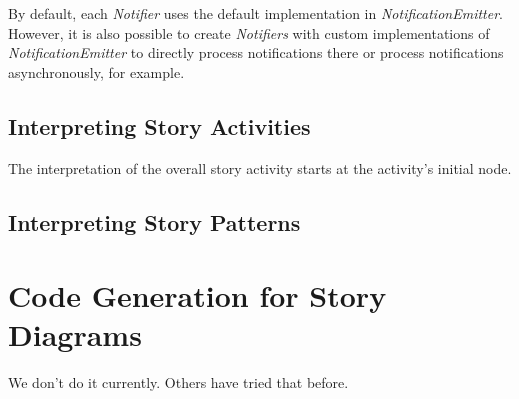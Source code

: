 By default, each \emph{Notifier} uses the default implementation in \emph{NotificationEmitter}. However, it is also possible to create \emph{Notifiers} with custom implementations of \emph{NotificationEmitter} to directly process notifications there or process notifications asynchronously, for example.


\subsection{Interpreting Story Activities}

The interpretation of the overall story activity starts at the activity's initial node. 




\subsection{Interpreting Story Patterns}


\section{Code Generation for Story Diagrams}
 We don't do it currently. Others have tried that before.\cite{GBD07}